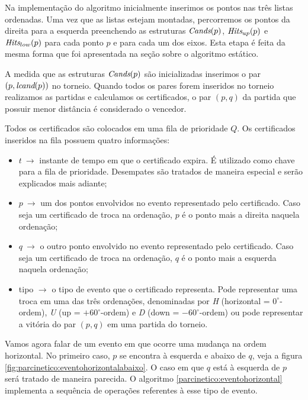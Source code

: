 Na implementação do algoritmo inicialmente inserimos os pontos nas
três listas ordenadas. Uma vez que as listas estejam montadas,
percorremos os pontos da direita para a esquerda preenchendo as
estruturas $\textit{Cands}(p)$, $\textit{Hits}_{up}(p)$ e $\textit{Hits}_{low}(p)$ para cada
ponto $p$ e para cada um dos eixos. Esta etapa é feita da mesma
forma que foi apresentada na seção sobre o algoritmo estático.

A medida que as estruturas $\textit{Cands}(p)$ são inicializadas inserimos o
par $(p, \textit{lcand}(p))$ no torneio. Quando todos os pares forem
inseridos no torneio realizamos as partidas e calculamos os
certificados, o par $(p, q)$ da partida que possuir menor distância
é considerado o vencedor.

Todos os certificados são colocados em uma fila de prioridade $Q$.
Os certificados inseridos na fila possuem quatro informações:
\begin{itemize}
    \item $t~\rightarrow$ instante de tempo em que o certificado
    expira. É utilizado como chave para a fila de prioridade.
    Desempates são tratados de maneira especial e serão explicados
    mais adiante;
    \item $p~\rightarrow$ um dos pontos envolvidos no evento
    representado pelo certificado. Caso seja um certificado de troca
    na ordenação, $p$ é o ponto mais a direita naquela ordenação;
    \item $q~\rightarrow$ o outro ponto envolvido no evento
    representado pelo certificado. Caso seja um certificado de troca
    na ordenação, $q$ é o ponto mais a esquerda naquela ordenação;
    \item tipo $ \rightarrow$ o tipo de evento que o certificado
    representa. Pode representar uma troca em uma das três
    ordenações, denominadas por \textit{H} (horizontal =
    $0^\circ$-ordem), \textit{U} (up = $+60^\circ$-ordem) e
    \textit{D} (down = $-60^\circ$-ordem) ou pode representar a
    vitória do par $(p, q)$ em uma partida do torneio.
\end{itemize}

Vamos agora falar de um evento em que ocorre uma mudança na ordem
horizontal. No primeiro caso, $p$ se encontra à esquerda e abaixo de
$q$, veja a figura \ref{fig:parcinetico:eventohorizontalabaixo}. O
caso em que $q$ está à esquerda de $p$ será tratado de maneira
parecida. O algoritmo \ref{parcinetico:eventohorizontal} implementa
a sequência de operações referentes à esse tipo de evento.


